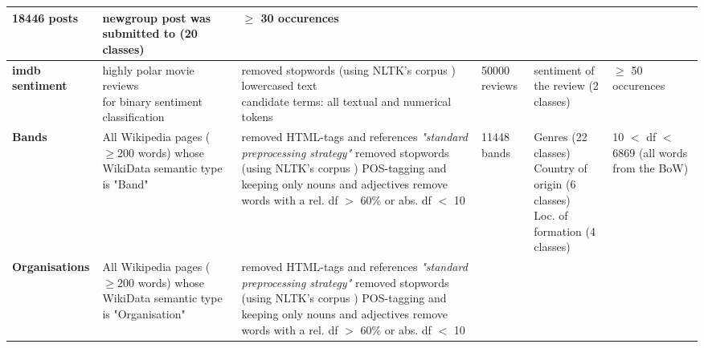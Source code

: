 \begin{landscape}
\begin{table}[]
{\begin{tabular}{@{}llllll@{}}
        		18446 posts &
        		\tabitem newgroup post was submitted to (20 classes) &
        		$\geq$ 30 occurences 
        		\\ \midrule
        	\textbf{imdb sentiment\tablefootnote{\url{http://ai.stanford.edu/~amaas/data/sentiment/} \cite{maas-EtAl:2011:ACL-HLT2011}} \cite{Ager2018}} &
				\specialcell[l]{highly polar movie reviews\\for binary sentiment classification}  &
        		\specialcell[l]{ \tabitem removed stopwords (using NLTK's corpus \cite{loper-bird-2002-nltk})\\ \tabitem lowercased text\\ \tabitem candidate terms: all textual and numerical tokens} &
        		50000 reviews &
        		\tabitem sentiment of the review (2 classes) &
        		$\geq$ 50 occurences
        		\\ \midrule
        	\textbf{Bands \cite{Alshaikh2020}} &
        		\specialcell[l]{All Wikipedia pages ($\geq 200$ words) whose \\ WikiData semantic type is "Band"} &
        		\specialcell[l]{ \tabitem removed HTML-tags and references \\ \tabitem \textit{"standard preprocessing strategy"} \cite[137]{Alshaikh2019} \\ \tabitem removed stopwords (using NLTK's corpus \cite{loper-bird-2002-nltk})\\ \tabitem POS-tagging and keeping only nouns and adjectives \\ \tabitem remove words with a rel. \acrshort{df}  $>$ 60\% or abs. \acrshort{df} $<$ 10 } &
        		11448 bands & \specialcell[l]{ \tabitem Genres (22 classes) \\ \tabitem Country of origin (6 classes) \\ \tabitem Loc. of formation (4 classes) }  & 
        		\specialcell[l]{ 10 $<$ \acrshort{df} $<$ 6869 \\ (all words from the BoW)}\\ \midrule
        	\textbf{Organisations\tablefootnote{\label{fnote:for_alshaikh2019}Originally created in and for \cite{Alshaikh2019}} \cite{Alshaikh2020}} &
        		\specialcell[l]{All Wikipedia pages ($\geq 200$ words) whose \\ WikiData semantic type is "Organisation"} &
        		\specialcell[l]{ \tabitem removed HTML-tags and references \\ \tabitem \textit{"standard preprocessing strategy"} \cite[137]{Alshaikh2019} \\ \tabitem removed stopwords (using NLTK's corpus \cite{loper-bird-2002-nltk})\\ \tabitem POS-tagging and keeping only nouns and adjectives \\ \tabitem remove words with a rel. \acrshort{df}  $>$ 60\% or abs. \acrshort{df} $<$ 10 } &

\end{tabular}}
\end{table}
\end{landscape}

